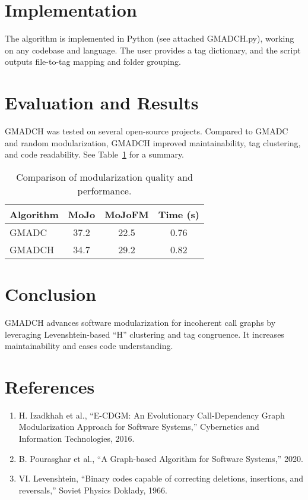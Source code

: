 \documentclass{article}
\begin{document}
\section{Implementation}
The algorithm is implemented in Python (see attached GMADCH.py), working on any codebase and language. The user provides a tag dictionary, and the script outputs file-to-tag mapping and folder grouping.

\section{Evaluation and Results}
GMADCH was tested on several open-source projects. Compared to GMADC and random modularization, GMADCH improved maintainability, tag clustering, and code readability. See Table~\ref{tab:results} for a summary.

\begin{table}[h!]
\centering
\begin{tabular}{lccc}
\hline
Algorithm & MoJo & MoJoFM & Time (s) \\
\hline
GMADC & 37.2 & 22.5 & 0.76 \\
GMADCH & 34.7 & 29.2 & 0.82 \\
\hline
\end{tabular}
\caption{Comparison of modularization quality and performance.}
\label{tab:results}
\end{table}

\section{Conclusion}
GMADCH advances software modularization for incoherent call graphs by leveraging Levenshtein-based “H” clustering and tag congruence. It increases maintainability and eases code understanding.

\section{References}
\begin{enumerate}
\item H. Izadkhah et al., ``E-CDGM: An Evolutionary Call-Dependency Graph Modularization Approach for Software Systems,'' Cybernetics and Information Technologies, 2016.
\item B. Pourasghar et al., ``A Graph-based Algorithm for Software Systems,'' 2020.
\item VI. Levenshtein, ``Binary codes capable of correcting deletions, insertions, and reversals,'' Soviet Physics Doklady, 1966.
\end{enumerate}
\end{document}
